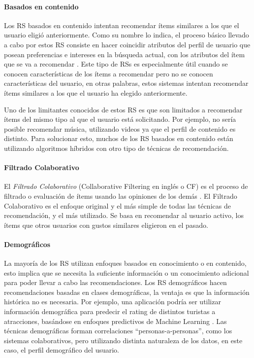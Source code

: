 \paragraph{Basados en contenido}
Los RS basados en contenido intentan recomendar ítems similares a los que el usuario eligió anteriormente. Como su nombre lo indica, el proceso básico llevado a cabo por estos RS consiste en hacer coincidir atributos del perfil de usuario que posean preferencias e intereses en la búsqueda actual, con los atributos del ítem que se va a recomendar \citep{lops2011content}. Este tipo de RSs es especialmente útil cuando se conocen características de los ítems a recomendar pero no se conocen características del usuario, en otras palabras, estos sistemas intentan recomendar ítems similares a los que el usuario ha elegido anteriormente. 

\bigskip Uno de los limitantes conocidos de estos RS es que son limitados a recomendar ítems del mismo tipo al que el usuario está solicitando. Por ejemplo, no sería posible recomendar música, utilizando videos ya que el perfil de contenido es distinto. Para solucionar esto, muchos de los RS basados en contenido están utilizando algoritmos híbridos con otro tipo de técnicas de recomendación.

\paragraph{Filtrado Colaborativo}
El \textit{Filtrado Colaborativo} (Collaborative Filtering en inglés o CF) es el proceso de filtrado o evaluación de ítems usando las opiniones de los demás \citep{schafer2007collaborative}. El Filtrado Colaborativo es el enfoque original y el más simple de todas las técnicas de recomendación, y el más utilizado. Se basa en recomendar al usuario activo, los ítems que otros usuarios con gustos similares eligieron en el pasado.

\paragraph{Demográficos}
La mayoría de los RS utilizan enfoques basados en conocimiento o en contenido, esto implica que se necesita la suficiente información o un conocimiento adicional para poder llevar a cabo las recomendaciones. Los RS demográficos hacen recomendaciones basadas en clases demográficas, la ventaja es que la información histórica no es necesaria. Por ejemplo, una aplicación podría ser utilizar información demográfica para predecir el rating de distintos turistas a atracciones, basándose en enfoques predictivos de Machine Learning \citep{wang2012applicability}. Las técnicas demográficas forman correlaciones “personas-a-personas”, como los sistemas colaborativos, pero utilizando distinta naturaleza de los datos, en este caso, el perfil demográfico del usuario.

